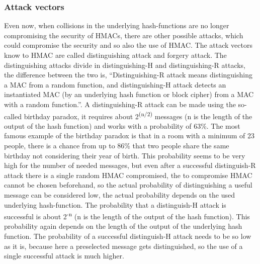 \subsubsection{Attack vectors}
Even now, when collisions in the underlying hash-functions are no longer compromising the security of HMACs, there are other possible attacks, which could compromise the security and so also the use of HMAC. The attack vectors know to HMAC are called distinguishing attack and forgery attack. The distinguishing attacks divide in distinguishing-H and distinguishing-R attacks, the difference between the two is, “Distinguishing-R attack means distinguishing a MAC from a random function, and distinguishing-H attack detects an instantiated MAC (by an underlying hash function or block cipher) from a MAC with a random function.”\cite{ATT1}. A distinguishing-R attack can be made using the so-called birthday paradox, it requires about 2\textsuperscript{(n$/$2)} messages (n is the length of the output of the hash function) and works with a probability of 63\%\cite{ATT1}. The most famous example of the birthday paradox is that in a room with a minimum of 23 people, there is a chance from up to 86\% that two people share the same birthday not considering their year of birth. This probability seems to be very high for the number of needed messages, but even after a successful distinguish-R attack there is a single random HMAC compromised, the to compromise HMAC cannot be chosen beforehand, so the actual probability of distinguishing a useful message can be considered low, the actual probability depends on the used underlying hash-function. The probability that a distinguish-H attack is successful is about 2\textsuperscript{-n}\cite{ATT1} (n is the length of the output of the hash function). This probability again depends on the length of the output of the underlying hash function. The probability of a successful distinguish-H attack needs to be so low as it is, because here a preselected message gets distinguished, so the use of a single successful attack is much higher. 
